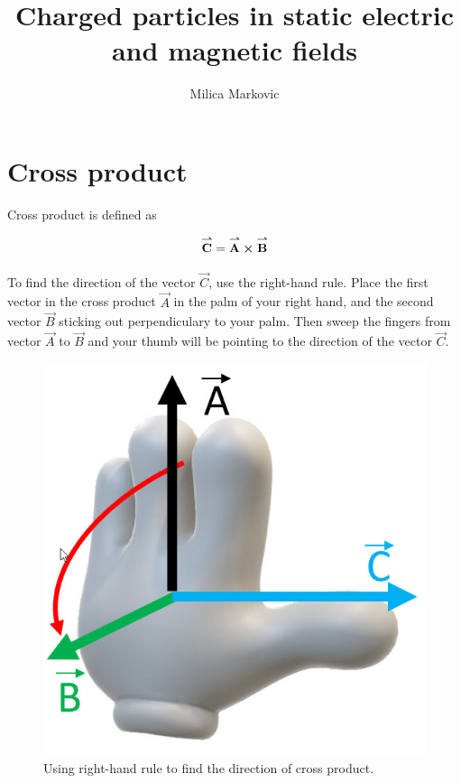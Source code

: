 \documentclass{ximera}
\title{Charged particles in static electric and magnetic fields}
\author{Milica Markovic}
\begin{document}
  
\begin{abstract}  

\end{abstract}  
\maketitle    

\section{Cross product}

Cross product is defined as

\begin{equation}
{\overset{\boldsymbol{\rightharpoonup}}{\mathbf{C}}}\hspace{0in}={\overset{\boldsymbol{\rightharpoonup}}{\mathbf{A}}}\hspace{0in} \boldsymbol\times {\overset{\boldsymbol{\rightharpoonup}}{\mathbf{B}}}\hspace{0in}
\end{equation}

To find the direction of the vector $\vec{C}$, use the right-hand rule. Place the first vector in the cross product $\vec{A}$ in the palm of your right hand, and the second vector $\vec{B}$ sticking out perpendiculary to your palm. Then sweep the fingers from vector $\vec{A}$ to $\vec{B}$ and your thumb will be pointing to the direction of the vector $\vec{C}$.


\begin{figure}[htbp]
\begin{center}
\includegraphics[scale=0.5]{../jpg/RHR.jpg}
\end{center}
\caption{Using right-hand rule to find the direction of cross product. }
\label{fig:crossProduct}
\end{figure}
\end{document}
